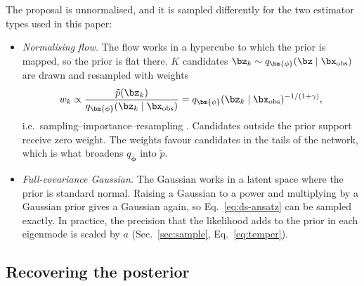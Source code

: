 The proposal is unnormalised, and it is sampled differently for the two
estimator types used in this paper:
\begin{itemize}
    \item \emph{Normalising flow.} The flow works in a hypercube to which the
          prior is mapped, so the prior is flat there. $K$ candidates
          $\bz_k\sim q_{\bm{\phi}}(\bz\mid\bx_{\mathrm{obs}})$ are drawn and
          resampled with weights
          \begin{equation}
              w_k\propto\frac{\tilde p(\bz_k)}{q_{\bm{\phi}}(\bz_k\mid\bx_{\mathrm{obs}})}
              =q_{\bm{\phi}}(\bz_k\mid\bx_{\mathrm{obs}})^{-1/(1+\gamma)},
              \label{eq:ds-sir}
          \end{equation}
          i.e.\ sampling--importance--resampling \citep{smith_bayesian_1992}.
          Candidates outside the prior support receive zero weight. The weights
          favour candidates in the tails of the network, which is what
          broadens $q_{\bm{\phi}}$ into $\tilde p$.
    \item \emph{Full-covariance Gaussian.} The Gaussian works in a latent
          space where the prior is standard normal. Raising a Gaussian to a
          power and multiplying by a Gaussian prior gives a Gaussian again, so
          Eq.~\eqref{eq:ds-ansatz} can be sampled exactly. In practice, the
          precision that the likelihood adds to the prior in each eigenmode is
          scaled by $a$ (Sec.~\ref{sec:sample}, Eq.~\ref{eq:temper}).
\end{itemize}

\subsection{Recovering the posterior}
\label{sec:ds-recover}


